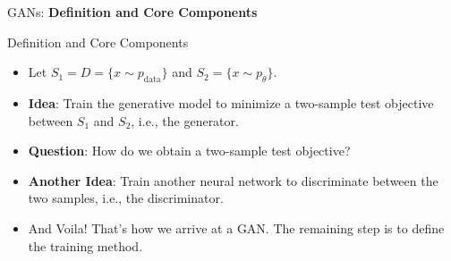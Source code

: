 \begin{frame}{}
    \LARGE GANs: \textbf{Definition and Core Components}
\end{frame}

\begin{frame}{Definition and Core Components}
\begin{itemize}
    \item Let $S_1 = D = \{x \sim p_{\text{data}}\}$ and $S_2 = \{x \sim p_\theta\}$.
    \item \textbf{Idea}: Train the generative model to minimize a two-sample test objective between $S_1$ and $S_2$, i.e., the generator.
    \item<2-> \textbf{Question}: How do we obtain a two-sample test objective?
    \item<3-> \textbf{Another Idea}: Train another neural network to discriminate between the two samples, i.e., the discriminator.
    \item<4-> And Voila! That's how we arrive at a GAN. The remaining step is to define the training method.
\end{itemize}
\end{frame}

